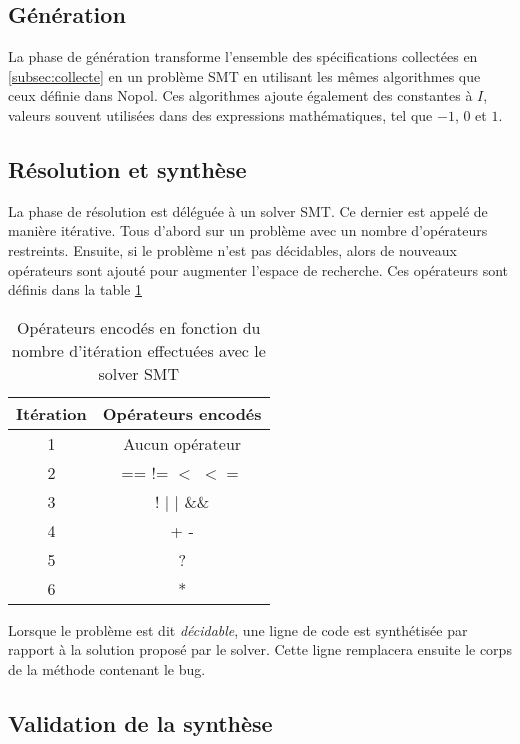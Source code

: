 \subsection{Génération}
\par La phase de génération transforme l'ensemble des spécifications collectées en \ref{subsec:collecte} en un problème SMT en utilisant les mêmes algorithmes que ceux définie dans Nopol\cite{nopol}. Ces algorithmes ajoute également des constantes à $I$, valeurs souvent utilisées dans des expressions mathématiques, tel que $-1$, $0$ et $1$. 
\subsection{Résolution et synthèse}
\label{subsec:synthese}
\par La phase de résolution est déléguée à un solver SMT. Ce dernier est appelé de manière itérative. Tous d'abord sur un problème avec un nombre d'opérateurs restreints. Ensuite, si le problème n'est pas décidables, alors de nouveaux opérateurs sont ajouté pour augmenter l'espace de recherche. Ces opérateurs sont définis dans la table \ref{table:operators}


\begin{table}[H]
\centering
\begin{tabular}{|c|c|}
  \hline
  Itération & Opérateurs encodés \\
  \hline
  1 & Aucun opérateur  \\
  2 & == != $<$ $<=$   \\
  3 & ! $|$ $|$ \&\&  \\
  4 & + -  \\
  5 & ?  \\
  6 & *  \\
  \hline
\end{tabular}

\caption{Opérateurs encodés en fonction du nombre d'itération effectuées avec le solver SMT}
\label{table:operators}
\end{table}

\par Lorsque le problème est dit \textit{décidable}, une ligne de code est synthétisée par rapport à la solution proposé par le solver. Cette ligne remplacera ensuite le corps de la méthode contenant le bug.

\subsection{Validation de la synthèse}

